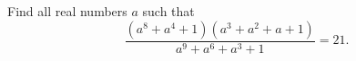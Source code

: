 Find all real numbers $a$ such that
\[
\dfrac{\left(a^8+a^4+1\right)\left(a^3+a^2+a+1\right)}{a^9+a^6+a^3+1}=21 .
\]
